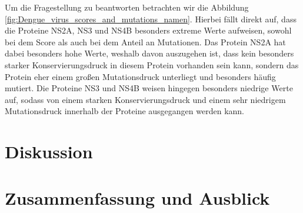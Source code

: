 \documentclass[german,version-2022-01]{uzl-thesis}
\begin{document}
Um die Fragestellung zu beantworten betrachten wir die Abbildung \ref{fig:Dengue_virus_scores_and_mutations_namen}. Hierbei f\"allt direkt auf, dass die Proteine NS2A, NS3 und NS4B besonders extreme Werte aufweisen, sowohl bei dem Score als auch bei dem Anteil an Mutationen. Das Protein NS2A hat dabei besonders hohe Werte, weshalb davon auszugehen ist, dass kein besonders starker Konservierungsdruck in diesem Protein vorhanden sein kann, sondern das Protein eher einem gro\ss{}en Mutationsdruck unterliegt und besonders h\"aufig mutiert. Die Proteine NS3 und NS4B weisen hingegen besonders niedrige Werte auf, sodass von einem starken Konservierungsdruck und einem sehr niedrigem Mutationsdruck innerhalb der Proteine ausgegangen werden kann. 
\chapter{Diskussion}


\chapter{Zusammenfassung und Ausblick}


%



%
\end{document}
